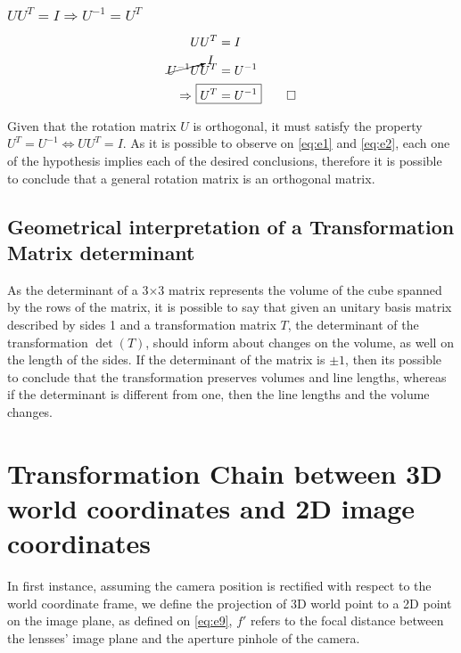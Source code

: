 \documentclass{article}
\begin{document}
\subsubsection*{$UU^{T} = I \Rightarrow U^{-1} = U^{T}$}
\begin{alignat}{2}
\nonumber
UU^{T} &= I \\
\nonumber
\cancelto{I}{U^{-1}U}U^{T} &= U^{-1} \\
\Rightarrow ~ \Aboxed{U^{T} &= U^{-1}} \qed \label{eq:e2}
\end{alignat}

Given that the rotation matrix $U$ is orthogonal, it must satisfy the property $U^{T} = U^{-1} \Leftrightarrow UU^{T} = I$. As it is possible to observe on \eqref{eq:e1} and \eqref{eq:e2}, each one of the hypothesis implies each of the desired conclusions, therefore it is possible to conclude that a general rotation matrix is an orthogonal matrix. 

\subsection{Geometrical interpretation of a Transformation Matrix determinant}
As the determinant of a 3$\times$3  matrix represents the volume of the cube spanned by the rows of the matrix, it is possible to say that given an unitary basis matrix described by sides 1 and a transformation matrix $T$, the determinant of the transformation $\det{(T)}$, should inform about changes on the volume, as well on the length of the sides. If the determinant of the matrix is $\pm 1$, then its possible to conclude that the transformation preserves volumes and line lengths, whereas if the determinant is different from one, then the line lengths and the volume changes.

\section{Transformation Chain between 3D world coordinates and 2D image coordinates}

In first instance, assuming the camera position is rectified with respect to the world coordinate frame, we define the projection of 3D world point to a 2D point on the image plane, as defined on  \eqref{eq:e9}, $f'$ refers to the focal distance between the lensses' image plane and the aperture pinhole of the camera.
\end{document}

